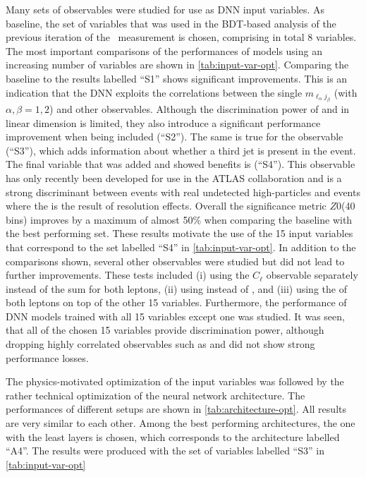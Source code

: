 Many sets of observables were studied for use as DNN input variables.
As baseline, the set of variables that was used in the BDT-based analysis of the previous iteration of the \HWW\ measurement \cite{HIGG-2016-07} is chosen, comprising in total 8 variables.
The most important comparisons of the performances of models using an increasing number of variables are shown in \cref{tab:input-var-opt}.
Comparing the baseline to the results labelled ``S1'' shows significant improvements. This is an indication that the DNN exploits the correlations between the single $m_{\ell_\alpha j_\beta}$ (with $\alpha, \beta = 1, 2$) and other observables. 
Although the discrimination power of \pTjone and \pTjtwo in linear dimension is limited, they also introduce a significant performance improvement when being included (``S2''). The same is true for the \pTjthree observable (``S3''), which adds information about whether a third jet is present in the event. 
The final variable that was added and showed benefits is \METSig (``S4''). This observable has only recently been developed for use in the ATLAS collaboration \cite{ATLAS-CONF-2018-038} and is a strong discriminant between events with real undetected high-\pT particles and events where the \MET is the result of resolution effects. 
Overall the significance metric $Z0$(40 bins) improves by a maximum of almost 50\% when comparing the baseline with the best performing set.
These results motivate the use of the 15 input variables that correspond to the set labelled ``S4'' in \cref{tab:input-var-opt}.
In addition to the comparisons shown, several other observables were studied but did not lead to further improvements. 
These tests included (i) using the $C_\ell$ observable separately instead of the sum for both leptons, (ii) using \MET instead of \METSig, and (iii) using the \pT of both leptons on top of the other 15 variables.
Furthermore, the performance of DNN models trained with all 15 variables except one was studied. It was seen, that all of the chosen 15 variables provide discrimination power, although dropping highly correlated observables such as \mjj and \dyjj did not show strong performance losses.

The physics-motivated optimization of the input variables was followed by the rather technical optimization of the neural network architecture. 
The performances of different setups are shown in \cref{tab:architecture-opt}. All results are very similar to each other. Among the best performing architectures, the one with the least layers is chosen, which corresponds to the architecture labelled ``A4''. The results were produced with the set of variables labelled ``S3'' in \cref{tab:input-var-opt}


